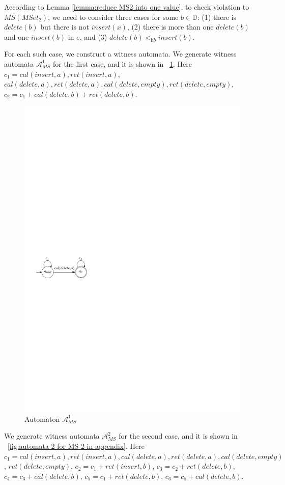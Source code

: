 {According to Lemma \ref{lemma:reduce MS2 into one value}, to check violation to $\textit{MS}(\textit{MSet}_2)$, we need to consider three cases for some $b \in \mathbb{D}$: (1) there is $\textit{delete}(b)$ but there is not $\textit{insert}(x)$, (2) there is more than one $\textit{delete}(b)$ and one $\textit{insert}(b)$ in $e$, and (3) $\textit{delete}(b) <_{\textit{hb}} \textit{insert}(b)$.

For each such case, we construct a witness automata. We generate witness automata $\mathcal{A}_{\textit{MS}}^1$ for the first case, and it is shown in \figurename~\ref{fig:automata 1 for MS-2 in appendix}. Here $c_1 = \textit{cal}(\textit{insert},a),\textit{ret}(\textit{insert},a)$, $\textit{cal}(\textit{delete},a),\textit{ret}(\textit{delete},a),
\textit{cal}(\textit{delete},\textit{empty}),\textit{ret}(\textit{delete},\textit{empty})$, $c_2 = c_1 + \textit{cal}(\textit{delete},b) + \textit{ret}(\textit{delete},b)$.


\begin{figure}[htbp]
  \centering
  \includegraphics[width=0.3 \textwidth]{figures/PIC_AUTO_MS_1.pdf}
  \caption{Automaton $\mathcal{A}_{\textit{MS}}^1$}
  \label{fig:automata 1 for MS-2 in appendix}
\end{figure}


We generate witness automata $\mathcal{A}_{\textit{MS}}^2$ for the second case, and it is shown in \figurename~\ref{fig:automata 2 for MS-2 in appendix}. Here $c_1 = \textit{cal}(\textit{insert},a),\textit{ret}(\textit{insert},a), \textit{cal}(\textit{delete},a),\textit{ret}(\textit{delete},a),\textit{cal}(\textit{delete},\textit{empty})$, $\textit{ret}(\textit{delete},\textit{empty})$, $c_2 = c_1 + \textit{ret}(\textit{insert},b)$, $c_3 = c_2 + \textit{ret}(\textit{delete},b)$, $c_4 = c_3 + \textit{cal}(\textit{delete},b)$, $c_5 = c_1 + \textit{ret}(\textit{delete},b)$, $c_6 = c_5 + \textit{cal}(\textit{delete},b)$.

}
